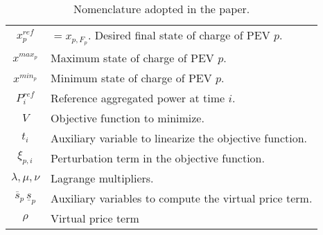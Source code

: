 \begin{table}[H]
\begin{tabular}{|c|p{}|}
        \(x^{ref}_p\) & $= x_{p, F_p}.$ Desired final state of charge of PEV $p$. \\
        \(x^{max_p}\) & Maximum state of charge of PEV $p$. \\
        \(x^{min_p}\) & Minimum state of charge of PEV $p$. \\
        \(P^{ref}_i\) & Reference aggregated power at time $i$. \\
        \(V\) & Objective function to minimize. \\
        \(t_i\) & Auxiliary variable to linearize the objective function. \\
        \(\xi_{p,i}\) & Perturbation term in the objective function. \\
        \(\lambda, \mu, \nu\) & Lagrange multipliers. \\
        \(\overline{s}_p\, \underline{s}_p\) & Auxiliary variables to compute the virtual price term. \\
        \(\rho\) & Virtual price term \\
        \hline
    \end{tabular}
    \caption{Nomenclature adopted in the paper.}
    \label{tab:nomenclature}
\end{table}